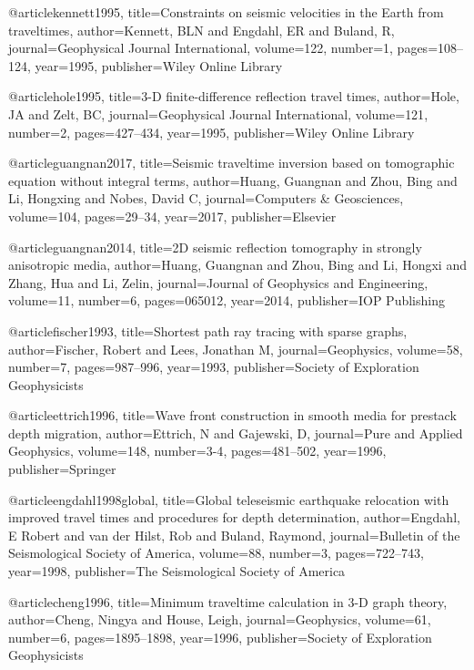 @article{kennett1995,
  title={Constraints on seismic velocities in the Earth from traveltimes},
  author={Kennett, BLN and Engdahl, ER and Buland, R},
  journal={Geophysical Journal International},
  volume={122},
  number={1},
  pages={108--124},
  year={1995},
  publisher={Wiley Online Library}
}


@article{hole1995,
  title={3-D finite-difference reflection travel times},
  author={Hole, JA and Zelt, BC},
  journal={Geophysical Journal International},
  volume={121},
  number={2},
  pages={427--434},
  year={1995},
  publisher={Wiley Online Library}
}


@article{guangnan2017,
  title={Seismic traveltime inversion based on tomographic equation without integral terms},
  author={Huang, Guangnan and Zhou, Bing and Li, Hongxing and Nobes, David C},
  journal={Computers \& Geosciences},
  volume={104},
  pages={29--34},
  year={2017},
  publisher={Elsevier}
}

@article{guangnan2014,
  title={2D seismic reflection tomography in strongly anisotropic media},
  author={Huang, Guangnan and Zhou, Bing and Li, Hongxi and Zhang, Hua and Li, Zelin},
  journal={Journal of Geophysics and Engineering},
  volume={11},
  number={6},
  pages={065012},
  year={2014},
  publisher={IOP Publishing}
}

@article{fischer1993,
  title={Shortest path ray tracing with sparse graphs},
  author={Fischer, Robert and Lees, Jonathan M},
  journal={Geophysics},
  volume={58},
  number={7},
  pages={987--996},
  year={1993},
  publisher={Society of Exploration Geophysicists}
}

@article{ettrich1996,
  title={Wave front construction in smooth media for prestack depth migration},
  author={Ettrich, N and Gajewski, D},
  journal={Pure and Applied Geophysics},
  volume={148},
  number={3-4},
  pages={481--502},
  year={1996},
  publisher={Springer}
}


@article{engdahl1998global,
  title={Global teleseismic earthquake relocation with improved travel times and procedures for depth determination},
  author={Engdahl, E Robert and van der Hilst, Rob and Buland, Raymond},
  journal={Bulletin of the Seismological Society of America},
  volume={88},
  number={3},
  pages={722--743},
  year={1998},
  publisher={The Seismological Society of America}
}

@article{cheng1996,
  title={Minimum traveltime calculation in 3-D graph theory},
  author={Cheng, Ningya and House, Leigh},
  journal={Geophysics},
  volume={61},
  number={6},
  pages={1895--1898},
  year={1996},
  publisher={Society of Exploration Geophysicists}
}


